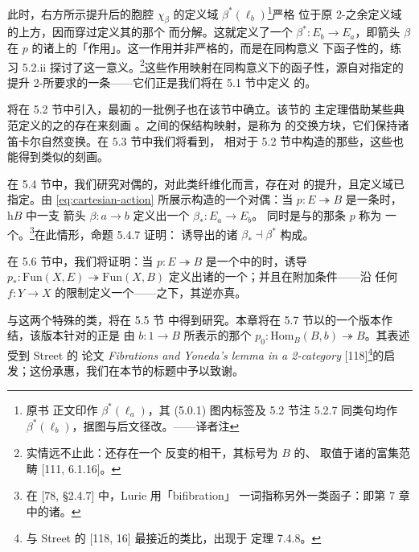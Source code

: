 此时，右方所示提升后的胞腔 $\chi_{\beta}$ 的定义域 $\beta^{*}(\ell_{b})$\footnote{原书
正文印作 $\beta^{*}(\ell_{a})$，其 (5.0.1) 图内标签及 5.2 节注 5.2.7 同类句均作
$\beta^{*}(\ell_{b})$，据图与后文径改。——译者注}严格
位于原 2-\trCell{}之余定义域的上方，因而穿过定义其\trFiber{}的那个\trPullback{}%
而分解。这就定义了一个\trFunctor{} $\beta^{*}\colon E_{b}\to E_{a}$，即箭头
$\beta$ 在 $p$ 的诸\trFiber{}上的「作用」。这一作用并非严格的，而是在同构意义
下函子性的，练习 5.2.ii 探讨了这一意义。\footnote{实情远不止此：还存在一个
反变的\trHomotopy{}相干\trDiagram{}，其标号为 $B$ 的\trUnderlyingQuasiCategory{}、
取值于诸\trDiscrete{}\trInfinityCategory{}的\trKanComplex{}富集范畴
[111, 6.1.16]。}这些作用映射在同构意义下的函子性，源自对指定的提升
2-\trCell{}所要求的一条\trUniversalProperty——它们正是我们将在 5.1 节中定义
的\emph{\trCartesianArrow}。

\trCartesianFibration{}将在 5.2 节中引入，最初的一批例子也在该节中确立。该节的
主定理借助某些典范定义的\trFunctor{}之\trAdjunction{}的存在来刻画%
\trCartesianFibration。\trCartesianFibration{}之间的保结构映射，是称为%
\emph{\trCartesianFunctor}的交换方块，它们保持诸笛卡尔自然变换。在 5.3 节中我们将看到，
相对于 5.2 节中构造的那些\trAdjunction{}，这些\trCartesianFunctor{}也能得到类似的刻画。

在 5.4 节中，我们研究对偶的\trCocartesianFibration，对此类纤维化而言，存在对%
\trNaturalTransformation{}的提升，且定义域\trFunctor{}已指定。由
\eqref{eq:cartesian-action} 所展示构造的一个对偶：当
$p\colon E\twoheadrightarrow B$ 是一条\trCocartesianFibration{}时，$\mathrm{h}B$ 中一支
箭头 $\beta\colon a\to b$ 定义出一个\trFunctor{} $\beta_{*}\colon E_{a}\to E_{b}$。
同时是\trCartesianFibration{}与\trCocartesianFibration{}的那条\trIsofibration{} $p$ 称为
一个\emph{\trBifibration}。\footnote{在 [78, \S2.4.7] 中，Lurie 用「bifibration」
一词指称另外一类函子：即第 7 章中的诸\trModule{}。}在此情形，命题 5.4.7 证明：
诱导出的诸\trFunctor{} $\beta_{*}\dashv\beta^{*}$ 构成\trAdjunction。

在 5.6 节中，我们将证明：当 $p\colon E\twoheadrightarrow B$
是一个\trInfinityCosmos{}中的\trCartesianFibration{}时，诱导\trFunctor{}
$p_{*}\colon\mathrm{Fun}(X,E)\twoheadrightarrow\mathrm{Fun}(X,B)$
定义出诸\trQuasiCategory{}的一个\trCartesianFibration；并且在附加条件——沿
任何 $f\colon Y\to X$ 的限制定义一个\trCartesianFunctor——之下，其逆亦真。

\emph{\trDiscreteCartesianFibration}与\emph{\trDiscreteCocartesianFibration}这两个特殊的类，将在 5.5 节
中得到研究。本章将在 5.7 节以\trYonedaLemma{}的一个版本作结，该版本针对的正是
由\trElement{} $b\colon 1\to B$ 所表示的那个\trDiscreteCartesianFibration
$p_{0}\colon\mathrm{Hom}_{B}(B,b)\twoheadrightarrow B$。其表述受到 Street 的
论文 \emph{Fibrations and Yoneda's lemma in a 2-category}
[118]\footnote{与 Street 的\trYonedaLemma{} [118, 16] 最接近的类比，出现于
定理 7.4.8。}的启发；这份承惠，我们在本节的标题中予以致谢。


